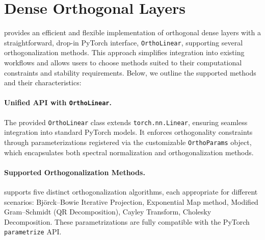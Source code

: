 \section{Dense Orthogonal Layers}
\label{sec:dense}

    \Orthogonium provides an efficient and flexible implementation of orthogonal dense layers with a straightforward, drop-in PyTorch interface, \verb|OrthoLinear|, supporting several orthogonalization methods. This approach simplifies integration into existing workflows and allows users to choose methods suited to their computational constraints and stability requirements. Below, we outline the supported methods and their characteristics:
    
    \paragraph{Unified API with \texttt{OrthoLinear}.}
    The provided \verb|OrthoLinear| class extends \verb|torch.nn.Linear|, ensuring seamless integration into standard PyTorch models. It enforces orthogonality constraints through parameterizations registered via the customizable \verb|OrthoParams| object, which encapsulates both spectral normalization and orthogonalization methods.
    
    \paragraph{Supported Orthogonalization Methods.}
    \Orthogonium supports five distinct orthogonalization algorithms, each appropriate for different scenarios: Björck–Bowie Iterative Projection, Exponential Map method, Modified Gram–Schmidt (QR Decomposition), Cayley Transform, Cholesky Decomposition. These parametrizations are fully compatible with the PyTorch \texttt{parametrize} API.
        
        
        
